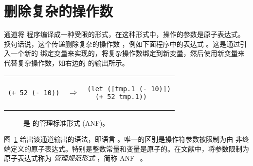 \documentclass[11pt]{book}
\begin{document}
\section{删除复杂的操作数}
\label{sec:remove-complex-opera-Rvar}

  通道将 \LangVar{}程序编译成一种受限的形式，在这种形式中，操作的参数是原子表达式。换句话说，这个传递删除复杂的操作数 ，例如下面程序中的表达式 
。这是通过引入一个新的
绑定变量来实现的，将复杂操作数绑定到新变量，然后使用新变量来代替复杂操作数，如右边的  的输出所示。\\
\begin{tabular}{lll}
\begin{minipage}{0.4\textwidth}
\begin{lstlisting}
(+ 52 (- 10))
\end{lstlisting}
\end{minipage}
&
$\Rightarrow$
&
\begin{minipage}{0.4\textwidth}
\begin{lstlisting}
(let ([tmp.1 (- 10)])
  (+ 52 tmp.1))
\end{lstlisting}
\end{minipage}
\end{tabular}


\begin{figure}[tp]
\centering
{}
\caption{\LangVarANF{} 是 \LangVar{} 的管理标准形式 (ANF)。}
\label{fig:r1-anf-syntax}
\end{figure}

图~\ref{fig:r1-anf-syntax} 给出该通道输出的语法，即语言 \LangVarANF{} 。唯一的区别是操作符参数被限制为由 \Atm{} 非终端定义的原子表达式。特别是整数常量和变量是原子的。在文献中，将参数限制为原子表达式称为 \emph{管理规范形式} ，简称
ANF~\citep{Danvy:1991fk,Flanagan:1993cg} 。
 
\end{document}
